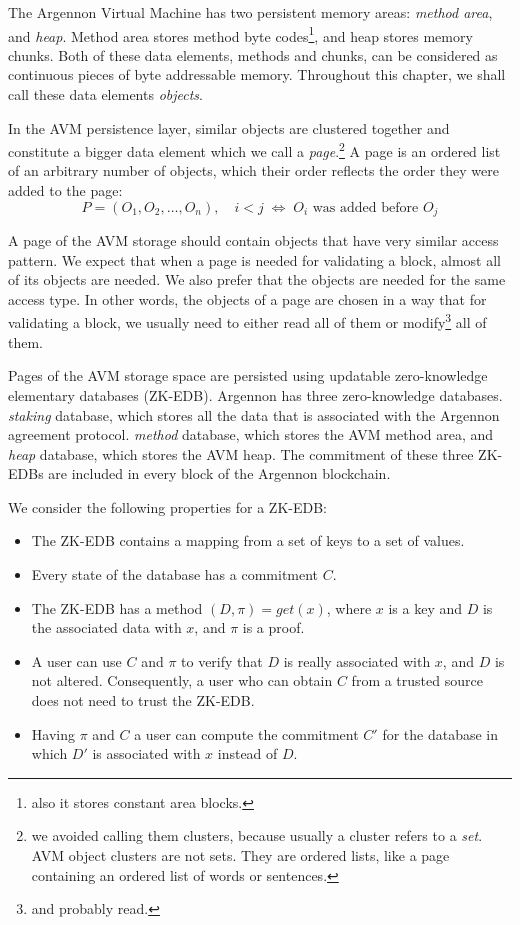 

The Argennon Virtual Machine has two persistent memory areas: \emph{method area}, and \emph{heap}. Method area stores
method byte codes\footnote{also it stores constant area blocks.}, and heap stores memory chunks. Both of these
data elements, methods and chunks, can be considered as continuous pieces of byte addressable memory. Throughout this
chapter, we shall call these data elements \emph{objects}.

In the AVM persistence layer, similar objects are clustered together and constitute a bigger data element which we call a
\emph{page}.\footnote{we avoided calling them clusters, because usually a cluster refers to a \emph{set}. AVM object
clusters are not sets. They are ordered lists, like a page containing an ordered list of words or sentences.}
A page is an ordered list of an arbitrary number of objects, which their order reflects the order they were added to
the page:
\[
    P = (O_1,O_2,\dots,O_n),\quad i < j \; \Leftrightarrow \; \textrm{$O_i$ was added before $O_j$}
\]

A page of the AVM storage should contain objects that have very similar access pattern. We expect that when a page
is needed for validating a block, almost all of its objects are needed. We also prefer that the objects
are needed for the same access type. In other words, the objects of a page are chosen in a way that
for validating a block, we usually need to either read all of them or modify\footnote{and probably read.} all of them.

Pages of the AVM storage space are persisted using updatable zero-knowledge elementary databases (ZK-EDB). Argennon
has three zero-knowledge databases. \emph{staking} database, which stores all the data that is associated with
the Argennon agreement protocol. \emph{method} database, which stores the AVM method area, and \emph{heap} database,
which stores the AVM heap. The commitment of these three ZK-EDBs are included in every block of the Argennon blockchain.

We consider the following properties for a ZK-EDB:
\begin{itemize}
    \item The ZK-EDB contains a mapping from a set of keys to a set of values.
    \item Every state of the database has a commitment \(C\).
    \item The ZK-EDB has a method \((D, \pi) = get(x)\), where \(x\) is a key and \(D\) is the associated data
    with \(x\), and \(\pi\) is a proof.
    \item A user can use \(C\) and \(\pi\) to verify that \(D\) is really associated with \(x\), and \(D\) is not
    altered. Consequently, a user who can obtain \(C\) from a trusted source does not need to trust the ZK-EDB\@.
    \item Having \(\pi\) and \(C\) a user can compute the commitment \(C'\) for the database in which \(D'\) is
    associated with \(x\) instead of \(D\).
\end{itemize}

